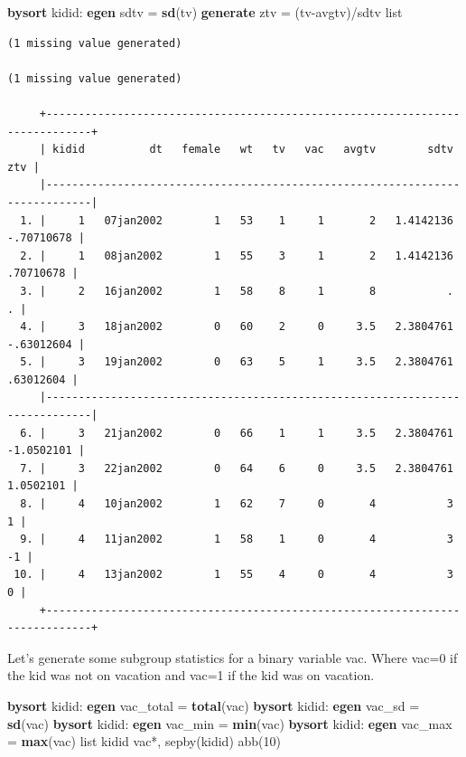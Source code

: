 \documentclass[
]{book}
\newenvironment{Shaded}{\begin{snugshade}}{\end{snugshade}}
\newcommand{\FunctionTok}[1]{\textcolor[rgb]{0.13,0.29,0.53}{\textbf{#1}}}
\newcommand{\KeywordTok}[1]{\textcolor[rgb]{0.13,0.29,0.53}{\textbf{#1}}}
\newcommand{\NormalTok}[1]{#1}
\newcommand{\OtherTok}[1]{\textcolor[rgb]{0.56,0.35,0.01}{#1}}
\begin{document}
\begin{Shaded}
\begin{Highlighting}[]
\KeywordTok{bysort}\NormalTok{ kidid: }\KeywordTok{egen}\NormalTok{ sdtv = }\FunctionTok{sd}\NormalTok{(tv)}
\KeywordTok{generate}\NormalTok{ ztv = (tv{-}avgtv)/sdtv}
\OtherTok{list} 
\end{Highlighting}
\end{Shaded}

\begin{verbatim}
(1 missing value generated)

(1 missing value generated)

     +-----------------------------------------------------------------------------+
     | kidid          dt   female   wt   tv   vac   avgtv        sdtv          ztv |
     |-----------------------------------------------------------------------------|
  1. |     1   07jan2002        1   53    1     1       2   1.4142136   -.70710678 |
  2. |     1   08jan2002        1   55    3     1       2   1.4142136    .70710678 |
  3. |     2   16jan2002        1   58    8     1       8           .            . |
  4. |     3   18jan2002        0   60    2     0     3.5   2.3804761   -.63012604 |
  5. |     3   19jan2002        0   63    5     1     3.5   2.3804761    .63012604 |
     |-----------------------------------------------------------------------------|
  6. |     3   21jan2002        0   66    1     1     3.5   2.3804761   -1.0502101 |
  7. |     3   22jan2002        0   64    6     0     3.5   2.3804761    1.0502101 |
  8. |     4   10jan2002        1   62    7     0       4           3            1 |
  9. |     4   11jan2002        1   58    1     0       4           3           -1 |
 10. |     4   13jan2002        1   55    4     0       4           3            0 |
     +-----------------------------------------------------------------------------+
\end{verbatim}

Let's generate some subgroup statistics for a binary variable vac.
Where vac=0 if the kid was not on vacation and vac=1 if the kid was on vacation.

\begin{Shaded}
\begin{Highlighting}[]
\KeywordTok{bysort}\NormalTok{ kidid: }\KeywordTok{egen}\NormalTok{ vac\_total = }\KeywordTok{total}\NormalTok{(vac)}
\KeywordTok{bysort}\NormalTok{ kidid: }\KeywordTok{egen}\NormalTok{ vac\_sd = }\FunctionTok{sd}\NormalTok{(vac)}
\KeywordTok{bysort}\NormalTok{ kidid: }\KeywordTok{egen}\NormalTok{ vac\_min = }\FunctionTok{min}\NormalTok{(vac)}
\KeywordTok{bysort}\NormalTok{ kidid: }\KeywordTok{egen}\NormalTok{ vac\_max = }\FunctionTok{max}\NormalTok{(vac)}
\OtherTok{list}\NormalTok{ kidid vac*, sepby(kidid) abb(10)}
\end{Highlighting}
\end{Shaded}
\end{document}

